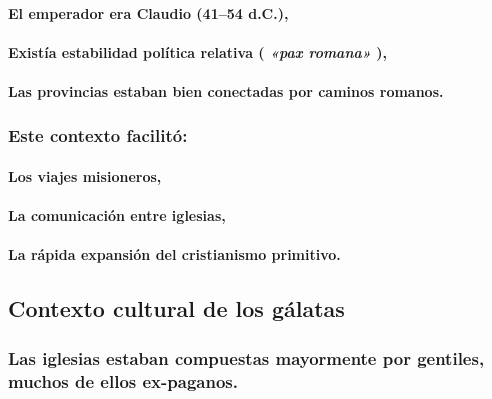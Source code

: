 \documentclass[11a pt,twoside]{article}
\newcommand{\scripture}[1]{%
  {\fontsize{12pt}{16pt}\selectfont\ScriptureFont\itshape #1}%
}
\let\oldsubsection\subsection
\renewcommand{\subsection}{\needspace{5\baselineskip}\oldsubsection}
\let\oldsubsubsection\subsubsection
\renewcommand{\subsubsection}{\needspace{4\baselineskip}\oldsubsubsection}
\let\oldparagraph\paragraph
\renewcommand{\paragraph}{\needspace{3\baselineskip}\oldparagraph}
\begin{document}
\paragraph{El emperador era Claudio (41--54
d.C.),}\label{el-emperador-era-claudio-4154-d.c.}

\paragraph{\texorpdfstring{Existía estabilidad política relativa
(\scripture{«pax romana»}),}{Existía estabilidad política relativa (),}}\label{existuxeda-estabilidad-poluxedtica-relativa-pax-romana}

\paragraph{Las provincias estaban bien conectadas por caminos
romanos.}\label{las-provincias-estaban-bien-conectadas-por-caminos-romanos.}

\subsubsection{Este contexto facilitó:}\label{este-contexto-facilituxf3}

\paragraph{Los viajes misioneros,}\label{los-viajes-misioneros}

\paragraph{La comunicación entre
iglesias,}\label{la-comunicaciuxf3n-entre-iglesias}

\paragraph{La rápida expansión del cristianismo
primitivo.}\label{la-ruxe1pida-expansiuxf3n-del-cristianismo-primitivo.}

\subsection{Contexto cultural de los
gálatas}\label{contexto-cultural-de-los-guxe1latas}

\subsubsection{Las iglesias estaban compuestas mayormente por gentiles,
muchos de ellos
ex-paganos.}\label{las-iglesias-estaban-compuestas-mayormente-por-gentiles-muchos-de-ellos-ex-paganos.}
\end{document}
